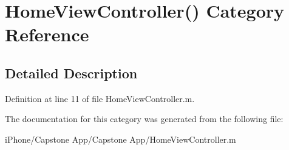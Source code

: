 \hypertarget{category_home_view_controller_07_08}{\section{Home\-View\-Controller() Category Reference}
\label{category_home_view_controller_07_08}
}


\subsection{Detailed Description}


Definition at line 11 of file Home\-View\-Controller.\-m.



The documentation for this category was generated from the following file\-:\begin{DoxyCompactItemize}
\item 
i\-Phone/\-Capstone App/\-Capstone App/Home\-View\-Controller.\-m\end{DoxyCompactItemize}
